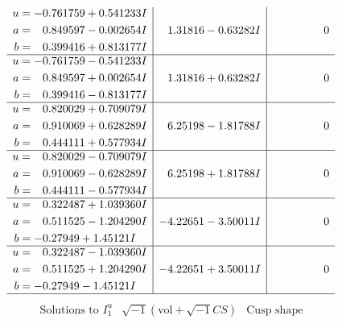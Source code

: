 \documentclass[1p]{elsarticle_modified}
\theoremstyle{definition}
\newcommand{\I}{\sqrt{-1}}
\begin{document}
$$\begin{array}{c|c|c}
\begin{aligned}
u &= -0.761759 + 0.541233 I \\
a &= \phantom{-}0.849597 - 0.002654 I \\
b &= \phantom{-}0.399416 + 0.813177 I\end{aligned}
 & \phantom{-}1.31816 - 0.63282 I & \phantom{-0.000000 } 0 \\ \hline\begin{aligned}
u &= -0.761759 - 0.541233 I \\
a &= \phantom{-}0.849597 + 0.002654 I \\
b &= \phantom{-}0.399416 - 0.813177 I\end{aligned}
 & \phantom{-}1.31816 + 0.63282 I & \phantom{-0.000000 } 0 \\ \hline\begin{aligned}
u &= \phantom{-}0.820029 + 0.709079 I \\
a &= \phantom{-}0.910069 + 0.628289 I \\
b &= \phantom{-}0.444111 + 0.577934 I\end{aligned}
 & \phantom{-}6.25198 - 1.81788 I & \phantom{-0.000000 } 0 \\ \hline\begin{aligned}
u &= \phantom{-}0.820029 - 0.709079 I \\
a &= \phantom{-}0.910069 - 0.628289 I \\
b &= \phantom{-}0.444111 - 0.577934 I\end{aligned}
 & \phantom{-}6.25198 + 1.81788 I & \phantom{-0.000000 } 0 \\ \hline\begin{aligned}
u &= \phantom{-}0.322487 + 1.039360 I \\
a &= \phantom{-}0.511525 - 1.204290 I \\
b &= -0.27949 + 1.45121 I\end{aligned}
 & -4.22651 - 3.50011 I & \phantom{-0.000000 } 0 \\ \hline\begin{aligned}
u &= \phantom{-}0.322487 - 1.039360 I \\
a &= \phantom{-}0.511525 + 1.204290 I \\
b &= -0.27949 - 1.45121 I\end{aligned}
 & -4.22651 + 3.50011 I & \phantom{-0.000000 } 0\\
 \hline 
 \end{array}$$\newpage$$\begin{array}{c|c|c}  
\text{Solutions to }I^u_{1}& \I (\text{vol} + \sqrt{-1}CS) & \text{Cusp shape}\\

\end{array}$$
\end{document}
